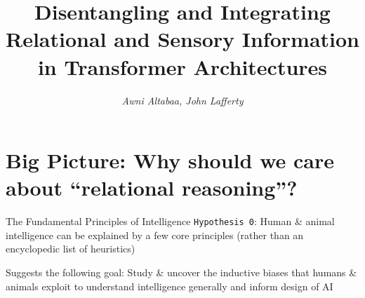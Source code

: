 \documentclass[xcolor={dvipsnames}]{beamer}
\title{Disentangling and Integrating Relational and Sensory Information in Transformer Architectures}
\author{\textit{Awni Altabaa, John Lafferty}}
\institute{Yale University \\
arXiv:2405.16727, ICML '25}
\begin{document}
\maketitle


\section{Big Picture: Why should we care about ``relational reasoning''?}

\begin{frame}{The Fundamental Principles of Intelligence}
    \alert{\texttt{Hypothesis 0}:} Human \& animal intelligence can be explained by a few core principles (rather than an encyclopedic list of heuristics)


    \alert{Suggests the following goal:} Study \& uncover the inductive biases that humans \& animals exploit to understand intelligence generally and inform design of AI

\end{frame}
\end{document}
